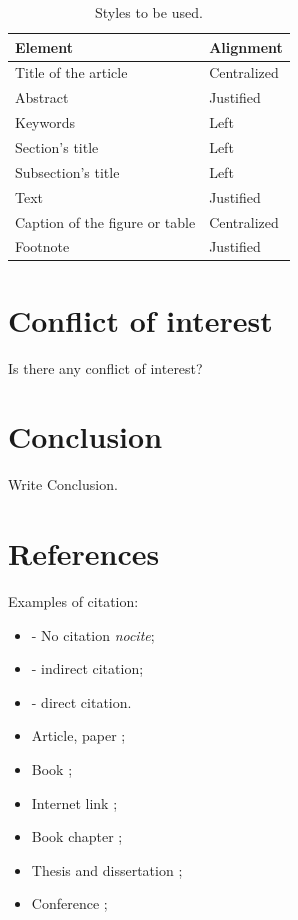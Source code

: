\documentclass[10pt,brazil,english]{article}
\begin{document}
\begin{table}[!hbtp]
\centering
\caption{Styles to be used.}
\label{Tab1}
\begin{tabular}{ll}
\hline
\textbf{Element}                        & \vline \textbf{Alignment}   \\ \hline
Title of the article           & \vline Centralized \\ \hline
Abstract                       & \vline Justified   \\ \hline
Keywords                       & \vline Left        \\ \hline
Section's title                & \vline Left        \\ \hline
Subsection's title             & \vline Left        \\ \hline
Text                           & \vline Justified   \\ \hline
Caption of the figure or table & \vline Centralized \\ \hline
Footnote                       & \vline Justified   \\ \hline
\end{tabular}
\end{table}

\section{Conflict of interest}

Is there any conflict of interest?

\section{Conclusion}

Write Conclusion.

\section{References}

Examples of citation:

\begin{itemize}
\item \nocite{Alexandria2014} - No citation \textit{nocite{}};
\item \cite{dana2010integral} - indirect citation;
\item {} - direct citation.
\end{itemize}

\begin{itemize}
\item Article, paper \cite{dana2010integral};
\item Book \cite{Dorigo2008};
\item Internet link \cite{Reis2012};
\item Book chapter \cite{Tavares2014};
\item Thesis \cite{elfes1989occupancy} and dissertation \cite{Hsia2006};
\item Conference \cite{Garrote2017};
\end{itemize}







\end{document}
